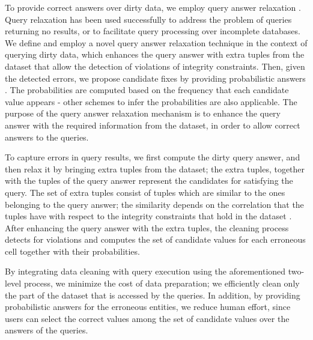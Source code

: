 To provide correct answers over dirty data, we employ query answer relaxation \cite{online_queryrelax, queryrelax_incomplete}. 
Query relaxation has been used successfully to address the problem of queries returning no results, 
or to facilitate query processing over incomplete databases. We define and employ a novel query answer relaxation technique in the context of querying
dirty data, which enhances the query answer with extra tuples from the dataset that allow the
detection of violations of integrity constraints. Then, given the detected errors, we propose candidate fixes by providing
probabilistic answers \cite{probabilistic_dbs}. The probabilities are computed based on the frequency that each candidate value appears - other schemes to infer the probabilities are also applicable.
The purpose of the query answer relaxation mechanism is to enhance the query answer with the required information from the dataset, in order to allow correct answers to the queries. 

To capture errors in query results, we first compute the dirty query answer, and then relax it by bringing extra tuples from the dataset; the extra tuples, together with the tuples of the query answer represent the candidates for satisfying the query. The set of extra tuples consist of tuples which are similar to the ones belonging to the query answer; the similarity depends on the correlation that the tuples have with respect to the integrity constraints that hold in the dataset \cite{scare}. 
After enhancing the query answer with the extra tuples, the cleaning process detects for violations and computes the set of
candidate values for each erroneous cell together with their probabilities. 

By integrating data cleaning with query execution using the aforementioned two-level process, we minimize the cost of data preparation; we efficiently clean only the part of the dataset that is accessed by the queries. In addition, by providing
probabilistic answers for the erroneous entities, we reduce human effort, since users can select the correct values among the set of candidate values over the answers of the queries.



